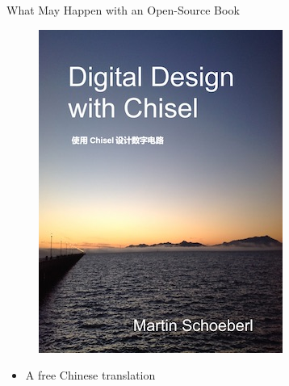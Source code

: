 \begin{frame}[fragile]{What May Happen with an Open-Source Book}
\begin{figure}
    \centering
    \includegraphics[scale=0.4]{../cover-small-chinese}
\end{figure}

\begin{itemize}
\item A free Chinese translation
\end{itemize}
\end{frame}

